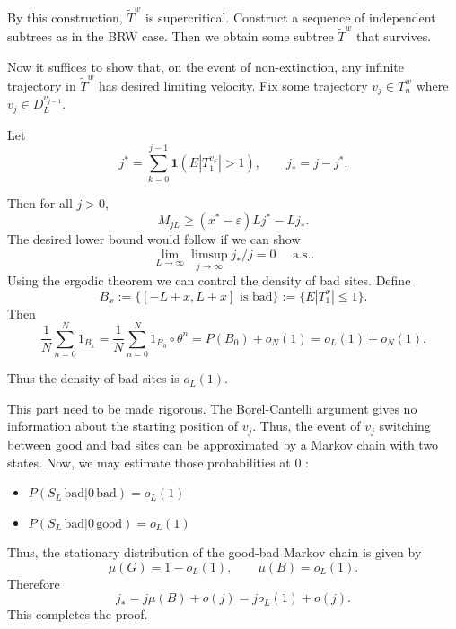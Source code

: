 By this construction, $\tilde T^w$ is supercritical. Construct a sequence of independent subtrees as in the BRW case. Then we obtain some subtree $\tilde T^w$ that survives.

Now it suffices to show that, on the event of non-extinction, any infinite trajectory in $\tilde T^w$ has desired limiting velocity. Fix some trajectory $v_j \in T^w_n$ where $v_{j} \in D^{v_{j - 1}}_L$.

Let
\[
	j^* = \sum_{k = 0}^{j - 1} \mathbf{1}\left( E|T_1^{v_k}| > 1 \right) , \qquad j_* = j - j^*
.\] 

Then for all $j > 0$,
\[
	M_{j L} \ge (x^* - \varepsilon) L j^* - L j_*
.\] 
The desired lower bound would follow if we can show
\[
	\lim_{L \to \infty}  \limsup_{j \to \infty } j_* / j  = 0 \quad \text{ a.s.}
.\] 
Using the ergodic theorem we can control the density of bad sites. Define
\[
	B_x := \{[-L + x, L + x] \text{ is bad}\}  := \{E|T^x_1| \le 1\} 
.\] 
Then
\[
	\frac{1}{N} \sum_{n=0}^{N} 1_{B_x} = \frac{1}{N} \sum_{n=0}^{N} 1_{B_0} \circ \theta^n = P(B_0) + o_N(1) = o_L(1) + o_N(1)
.\] 

Thus the density of bad sites is $o_L(1)$.

\underline{This part need to be made rigorous.} The Borel-Cantelli argument gives no information about the starting position of $v_j$. Thus, the event of $v_j$ switching between good and bad sites can be approximated by a Markov chain with two states. Now, we may estimate those probabilities at $0$ :
\begin{itemize}
	\item $P(S_L \,\text{bad} | 0\, \text{bad} ) = o_L(1)$
	\item $P(S_L \,\text{bad} | 0\, \text{good} ) = o_L(1)$
\end{itemize}

Thus, the stationary distribution of the good-bad Markov chain is given by
\[
	\mu(G) = 1 - o_L(1), \qquad \mu(B) = o_L(1)
.\] 
Therefore
\[
	j_* = j \mu(B) + o(j) = j o_L(1) + o(j)
.\] 
This completes the proof.


